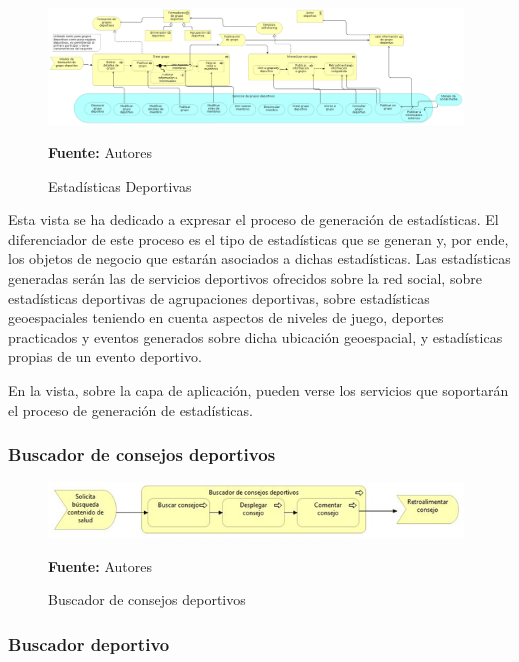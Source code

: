 \begin{figure}[!htb]
  \begin{center}
    \includegraphics[width=11cm]{./imagenes/Archimate/vistas/business_process/estadisticasdeportivas.png}
    \caption{Estadísticas Deportivas}
    \label{fig:bp_estadisticas_deportivo}
    \textbf{Fuente:}  Autores
  \end{center}
\end{figure}

Esta vista se ha dedicado a expresar el proceso de generación de estadísticas. El diferenciador de este proceso es el tipo de estadísticas que se generan y, por ende, los objetos de negocio que estarán asociados a dichas estadísticas. Las estadísticas generadas serán las de servicios deportivos ofrecidos sobre la red social, sobre estadísticas deportivas de agrupaciones deportivas, sobre estadísticas geoespaciales teniendo en cuenta aspectos de niveles de juego, deportes practicados y eventos generados sobre dicha ubicación geoespacial, y estadísticas propias de un evento deportivo.

En la vista, sobre la capa de aplicación, pueden verse los servicios que soportarán el proceso de generación de estadísticas.

\subsubsection{Buscador de consejos deportivos}

\begin{figure}[!htb]
  \begin{center}
    \includegraphics[width=11cm]{./imagenes/Archimate/vistas/business_process/buscadorconsejosdeportivos.png}
    \caption{Buscador de consejos deportivos}
    \label{fig:BP_BuscadorConsejosDeportivos}
    \textbf{Fuente:}  Autores
  \end{center}
\end{figure}

\subsubsection{Buscador deportivo}

